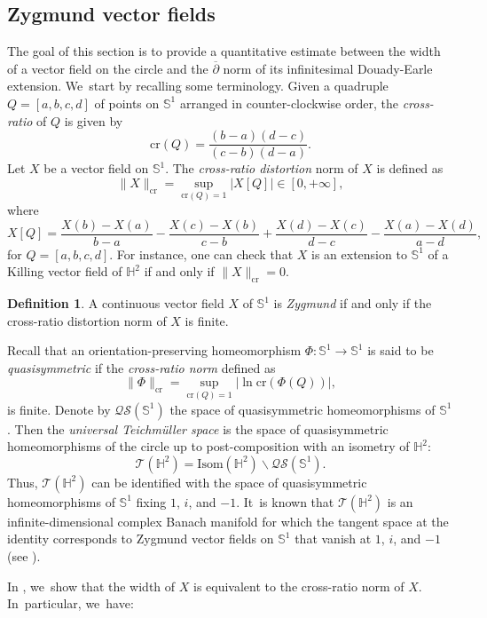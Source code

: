 \documentclass[11pt]{article}
\theoremstyle{plain}
\theoremstyle{definition}
\newtheorem{defi}[cor]{Definition}
\begin{document}
\subsection{Zygmund vector fields}
The goal of this section is to provide a quantitative estimate between the width of a vector field on the circle and the $\overline{\partial}$ norm of its infinitesimal Douady-Earle extension. We~start by recalling some terminology. Given a quadruple $Q=[a,b,c,d]$ of points on $\mathbb{S}^1$ arranged in counter-clockwise order, the \emph{cross-ratio} of $Q$ is given by
\[
\mathrm{cr}(Q)=\frac{ (b-a)(d-c) }{ (c-b)(d-a) }.
\]
Let $X$ be a vector field on $\mathbb{S}^1$. The \emph{cross-ratio distortion} norm of $X$ is defined as
\[
\lVert X \rVert_\mathrm{cr}=\sup_{\mathrm{cr}(Q)=1}\vert X[Q]\vert \in[0,+\infty],
\]
where
\[
X[Q]=\frac{X(b)-X(a)}{b-a}-\frac{X(c)-X(b)}{c-b}+\frac{X(d)-X(c)}{d-c}-\frac{X(a)-X(d)}{a-d},
\]
for $Q=[a,b,c,d]$. For instance, one can check that $X$ is an extension to $\mathbb{S}^1$ of a Killing vector field of $\mathbb{H}^2$ if and only if $\lVert X\rVert_\mathrm{cr}=0$.

\begin{defi}
A continuous vector field $X$ of $\mathbb{S}^1$ is \emph{Zygmund} if and only if the cross-ratio distortion norm of $X$ is finite.
\end{defi}
Recall that an orientation-preserving homeomorphism $\Phi:\mathbb{S}^1\to\mathbb{S}^1$ is said to be \emph{quasisymmetric} if the \emph{cross-ratio norm} defined as
\[
\lVert \Phi \rVert_\mathrm{cr}=\sup_{\mathrm{cr}(Q)=1} \vert{\ln\mathrm{cr}\left(\Phi(Q)\right)} \vert ,
\]
is finite. Denote by $\mathcal{QS}(\mathbb{S}^1)$ the space of quasisymmetric homeomorphisms of $\mathbb{S}^1$. Then the \emph{universal Teichmüller space} is the space of quasisymmetric homeomorphisms of the circle up to post-composition with an isometry of $\mathbb{H}^2$:
\[
\mathcal{T}(\mathbb{H}^2)=\mathrm{Isom}(\mathbb{H}^2)\backslash \mathcal{QS}(\mathbb{S}^1).
\]
Thus, $\mathcal{T}(\mathbb{H}^2)$ can be identified with the space of quasisymmetric homeomorphisms of $\mathbb{S}^1$ fixing $1$, $i$, and $-1$. It~is known that $\mathcal{T}(\mathbb{H}^2)$ is an infinite-dimensional complex Banach manifold for which the tangent space at the identity corresponds to Zygmund vector fields on $\mathbb{S}^1$ that vanish at $1$, $i$, and $-1$ (see \cite{Gardiner1999QuasiconformalTT}).

In \cite[Th.\,1.3]{diaf2023Infearth}, we~show that the width of $X$ is equivalent to the cross-ratio norm of $X$. In~particular, we~have:
\end{document}
